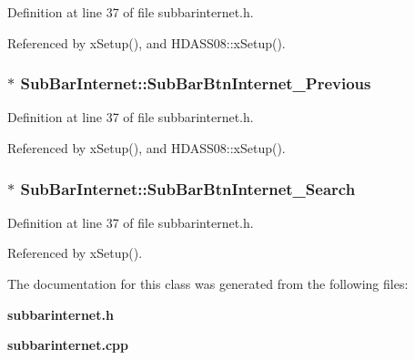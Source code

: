 Definition at line 37 of file subbarinternet.h.

Referenced by x\-Setup(), and HDASS08::x\-Setup().
\subsubsection{ $\ast$ {\bf Sub\-Bar\-Internet::Sub\-Bar\-Btn\-Internet\_\-Previous}}\label{classSubBarInternet_SubBarInterneto1}




Definition at line 37 of file subbarinternet.h.

Referenced by x\-Setup(), and HDASS08::x\-Setup().
\subsubsection{ $\ast$ {\bf Sub\-Bar\-Internet::Sub\-Bar\-Btn\-Internet\_\-Search}}\label{classSubBarInternet_SubBarInterneto3}




Definition at line 37 of file subbarinternet.h.

Referenced by x\-Setup().

The documentation for this class was generated from the following files:\begin{CompactItemize}
\item 
{\bf subbarinternet.h}\item 
{\bf subbarinternet.cpp}\end{CompactItemize}
